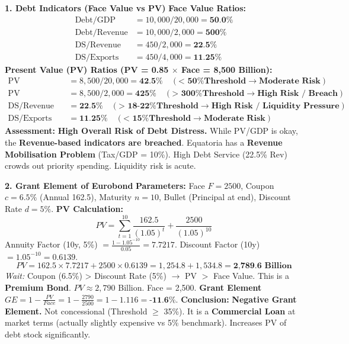 \documentclass[11pt]{article}
\begin{document}
\begin{exoresolu}
\textbf{1. Debt Indicators (Face Value vs PV)}
\textbf{Face Value Ratios:}
\begin{align*}
\text{Debt/GDP} &= 10,000 / 20,000 = \textbf{50.0\%} \\
\text{Debt/Revenue} &= 10,000 / 2,000 = \textbf{500\%} \\
\text{DS/Revenue} &= 450 / 2,000 = \textbf{22.5\%} \\
\text{DS/Exports} &= 450 / 4,000 = \textbf{11.25\%}
\end{align*}
\textbf{Present Value (PV) Ratios (PV = 0.85 $\times$ Face = 8,500 Billion):}
\begin{align*}
\text{PV Debt/GDP} &= 8,500 / 20,000 = \textbf{42.5\%} \quad (\textbf{< 50\% Threshold} \rightarrow \textbf{Moderate Risk}) \\
\text{PV Debt/Revenue} &= 8,500 / 2,000 = \textbf{425\%} \quad (\textbf{> 300\% Threshold} \rightarrow \textbf{High Risk / Breach}) \\
\text{DS/Revenue} &= \textbf{22.5\%} \quad (\textbf{> 18-22\% Threshold} \rightarrow \textbf{High Risk / Liquidity Pressure}) \\
\text{DS/Exports} &= \textbf{11.25\%} \quad (\textbf{< 15\% Threshold} \rightarrow \textbf{Moderate Risk})
\end{align*}
\textbf{Assessment:} \textbf{High Overall Risk of Debt Distress.} While PV/GDP is okay, the \textbf{Revenue-based indicators are breached}. Equatoria has a \textbf{Revenue Mobilisation Problem} (Tax/GDP = 10\%). High Debt Service (22.5\% Rev) crowds out priority spending. Liquidity risk is acute.

\textbf{2. Grant Element of Eurobond}
\textbf{Parameters:} Face $F=2500$, Coupon $c=6.5\%$ (Annual 162.5), Maturity $n=10$, Bullet (Principal at end), Discount Rate $d=5\%$.
\textbf{PV Calculation:}
\[
PV = \sum_{t=1}^{10} \frac{162.5}{(1.05)^t} + \frac{2500}{(1.05)^{10}}
\]
Annuity Factor (10y, 5\%) $= \frac{1 - 1.05^{-10}}{0.05} = 7.7217$.
Discount Factor (10y) $= 1.05^{-10} = 0.6139$.
\[
PV = 162.5 \times 7.7217 + 2500 \times 0.6139 = 1,254.8 + 1,534.8 = \textbf{2,789.6 Billion}
\]
\textit{Wait:} Coupon (6.5\%) > Discount Rate (5\%) $\rightarrow$ PV $>$ Face Value. This is a \textbf{Premium Bond}.
$PV \approx 2,790$ Billion. Face = 2,500.
\textbf{Grant Element} $GE = 1 - \frac{PV}{Face} = 1 - \frac{2790}{2500} = 1 - 1.116 = \textbf{-11.6\%}$.
\textbf{Conclusion:} \textbf{Negative Grant Element.} Not concessional (Threshold $\ge$ 35\%). It is a \textbf{Commercial Loan} at market terms (actually slightly expensive vs 5\% benchmark). Increases PV of debt stock significantly.


\end{exoresolu}
\end{document}
